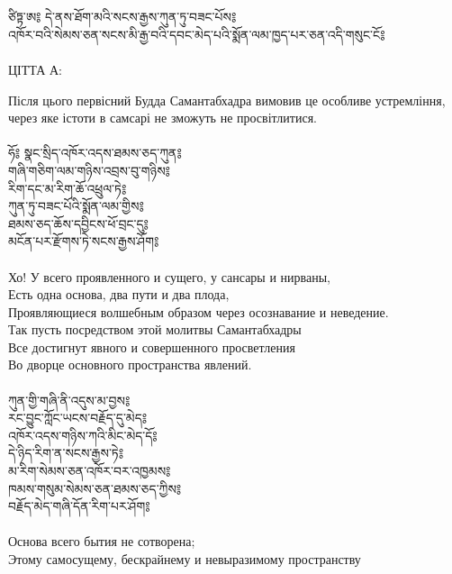 
\\
\\
{\ti
ཙིཏྟ་ཨ༔ དེ་ནས་ཐོག་མའི་སངས་རྒྱས་ཀུན་ཏུ་བཟང་པོས༔\\
འཁོར་བའི་སེམས་ཅན་སངས་མི་རྒྱ་བའི་དབང་མེད་པའི་སྨོན་ལམ་ཁྱད་པར་ཅན་འདི་གསུང་ངོ༔}\\
\\
ЦІТТА А:

Після цього первісний Будда Самантабхадра вимовив 
це особливе устремління, через яке істоти в самсарі
не зможуть не просвітлитися.\\
\\
{\ti
ཧོ༔ སྣང་སྲིད་འཁོར་འདས་ཐམས་ཅད་ཀུན༔\\
གཞི་གཅིག་ལམ་གཉིས་འབྲས་བུ་གཉིས༔ \\
རིག་དང་མ་རིག་ཆོ་འཕྲུལ་ཏེ༔ \\
ཀུན་ཏུ་བཟང་པོའི་སྨོན་ལམ་གྱིས༔ \\
ཐམས་ཅད་ཆོས་དབྱིངས་ཕོ་བྲང་དུ༔ \\
མངོན་པར་རྫོགས་ཏེ་སངས་རྒྱས་ཤོག༔ }\\
\\
Хо! У всего проявленного и сущего, у сансары и нирваны,\\
Есть одна основа, два пути и два плода,\\
Проявляющиеся волшебным образом через осознавание и неведение.\\
Так пусть посредством этой молитвы Самантабхадры\\
Все достигнут явного и совершенного просветления\\
Во дворце основного пространства явлений.\\
\newpage
\\
{\ti
ཀུན་གྱི་གཞི་ནི་འདུས་མ་བྱས༔\\
རང་བྱུང་ཀློང་ཡངས་བརྗོད་དུ་མེད༔\\
འཁོར་འདས་གཉིས་ཀའི་མིང་མེད་དོ༔\\
དེ་ཉིད་རིག་ན་སངས་རྒྱས་ཏེ༔\\
མ་རིག་སེམས་ཅན་འཁོར་བར་འཁྱམས༔\\
ཁམས་གསུམ་སེམས་ཅན་ཐམས་ཅད་ཀྱིས༔\\
བརྗོད་མེད་གཞི་དོན་རིག་པར་ཤོག༔}\\
\\
Основа всего бытия не сотворена;\\
Этому самосущему, бескрайнему и невыразимому пространству \\
